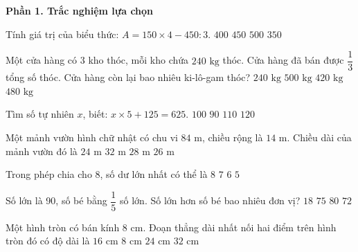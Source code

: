 \textbf{Phần 1. Trắc nghiệm lựa chọn}

\begin{ex} %
Tính giá trị của biểu thức: $A = 150 \times 4 - 450 : 3$.
\choice
{$400$}
{\True $450$}
{$500$}
{$350$}
\end{ex}

\begin{ex} %
Một cửa hàng có 3 kho thóc, mỗi kho chứa $240\text{ kg}$ thóc. Cửa hàng đã bán được $\dfrac{1}{3}$ tổng số thóc. Cửa hàng còn lại bao nhiêu ki-lô-gam thóc?
\choice
{$240\text{ kg}$}
{$500\text{ kg}$}
{$420\text{ kg}$}
{\True $480\text{ kg}$}
\end{ex}

\begin{ex} %
Tìm số tự nhiên $x$, biết: $x \times 5 + 125 = 625$.
\choice
{\True $100$}
{$90$}
{$110$}
{$120$}
\end{ex}

\begin{ex} %
Một mảnh vườn hình chữ nhật có chu vi $84\text{ m}$, chiều rộng là $14\text{ m}$. Chiều dài của mảnh vườn đó là
\choice
{$24\text{ m}$}
{$32\text{ m}$}
{\True $28\text{ m}$}
{$26\text{ m}$}
\end{ex}

\begin{ex} %
Trong phép chia cho 8, số dư lớn nhất có thể là
\choice
{$8$}
{\True $7$}
{$6$}
{$5$}
\end{ex}

\begin{ex} %
Số lớn là 90, số bé bằng $\dfrac{1}{5}$ số lớn. Số lớn hơn số bé bao nhiêu đơn vị?
\choice
{$18$}
{$75$}
{$80$}
{\True $72$}
\end{ex}

\begin{ex} %
Một hình tròn có bán kính $8\text{ cm}$. Đoạn thẳng dài nhất nối hai điểm trên hình tròn đó có độ dài là
\choice
{\True $16\text{ cm}$}
{$8\text{ cm}$}
{$24\text{ cm}$}
{$32\text{ cm}$}
\end{ex}

